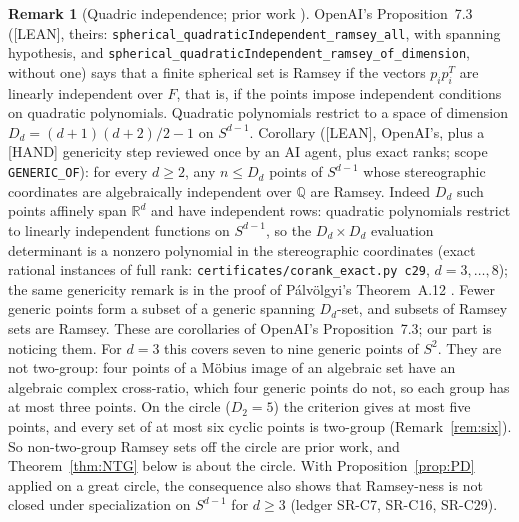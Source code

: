 \documentclass[11pt]{amsart}
\newcommand{\st}[1]{\textsf{[#1]}}
\newcommand{\Q}{\mathbb{Q}}
\newcommand{\R}{\mathbb{R}}
\theoremstyle{plain}
\theoremstyle{definition}
\newtheorem{remark}[theorem]{Remark}
\begin{document}
\begin{remark}[Quadric independence; prior work \cite{OAI172}]\label{rem:quadric}
OpenAI's Proposition~7.3 \cite{OAI172} (\st{LEAN}, theirs: \texttt{spherical\_\allowbreak{}quadraticIndependent\_\allowbreak{}ramsey\_\allowbreak{}all},
with spanning hypothesis, and \texttt{spherical\_\allowbreak{}quadraticIndependent\_\allowbreak{}ramsey\_\allowbreak{}of\_\allowbreak{}dimension}, without
one) says that a finite spherical set is Ramsey if the vectors $p_ip_i^T$ are linearly independent over
$F$, that is, if the points impose independent conditions on quadratic polynomials. Quadratic
polynomials restrict to a space of dimension $D_d=(d+1)(d+2)/2-1$ on $S^{d-1}$. Corollary
(\st{LEAN}, OpenAI's, plus a \st{HAND} genericity step reviewed once by an AI agent, plus exact ranks;
scope \texttt{GENERIC\_OF}): for every $d\ge2$, any $n\le D_d$ points of $S^{d-1}$ whose stereographic
coordinates are algebraically independent over $\Q$ are Ramsey. Indeed $D_d$ such points affinely span
$\R^d$ and have independent rows: quadratic polynomials restrict to linearly independent functions on
$S^{d-1}$, so the $D_d\times D_d$ evaluation determinant is a nonzero polynomial in the stereographic
coordinates (exact rational instances of full rank: \texttt{certificates/corank\_exact.py c29},
$d=3,\dots,8$); the same genericity remark is in the proof
of P\'alv\"olgyi's Theorem~A.12 \cite{Palvolgyi}. Fewer generic points form a subset of a generic
spanning $D_d$-set, and subsets of Ramsey sets are Ramsey. These are corollaries of OpenAI's
Proposition~7.3; our part is noticing them. For $d=3$ this covers seven to nine generic points of $S^2$. They are not
two-group: four points of a M\"obius image of an algebraic set have an algebraic complex cross-ratio,
which four generic points do not, so each group has at most three points. On the circle ($D_2=5$) the
criterion gives at most five points, and every set of at most six cyclic points is two-group
(Remark~\ref{rem:six}). So non-two-group Ramsey sets off the circle are prior work, and
Theorem~\ref{thm:NTG} below is about the circle. With Proposition~\ref{prop:PD} applied on a great
circle, the consequence also shows that Ramsey-ness is not closed under specialization on $S^{d-1}$ for
$d\ge3$ (ledger SR-C7, SR-C16, SR-C29).
\end{remark}
\end{document}
